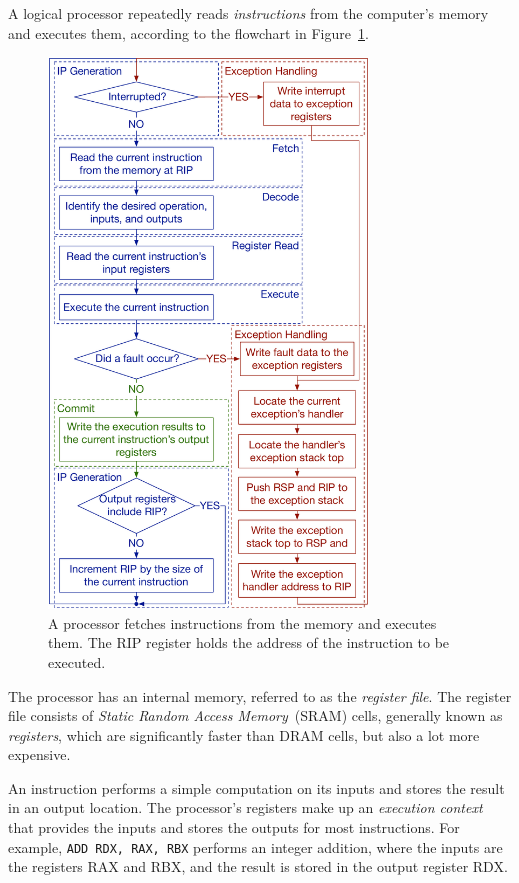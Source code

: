 A logical processor repeatedly reads \textit{instructions} from the
computer's memory and executes them, according to the flowchart in
Figure~\ref{fig:processor_execution}.

\begin{figure}[hbt]
  \centering
  \includegraphics[width=85mm]{figures/processor_execution.pdf}
  \caption{
    A processor fetches instructions from the memory and executes them. The RIP
    register holds the address of the instruction to be executed.
  }
  \label{fig:processor_execution}
\end{figure}

The processor has an internal memory, referred to as the
\textit{register file}. The register file consists of \textit{Static Random
Access Memory}~(SRAM) cells, generally known as \textit{registers}, which are
significantly faster than DRAM cells, but also a lot more expensive.

An instruction performs a simple computation on its inputs and stores the
result in an output location. The processor's registers make up an
\textit{execution context} that provides the inputs and stores the outputs for
most instructions. For example, \texttt{ADD RDX, RAX, RBX} performs an integer
addition, where the inputs are the registers RAX and RBX, and the result is
stored in the output register RDX.

